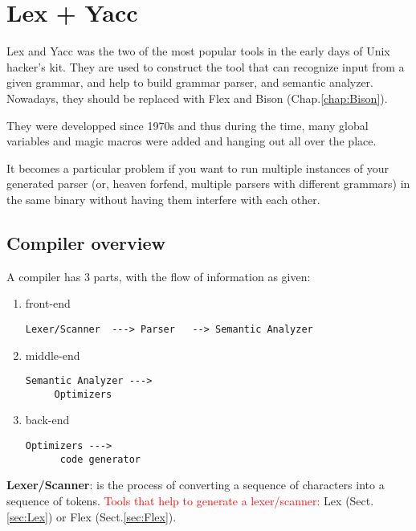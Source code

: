 \chapter{Lex + Yacc}

Lex and Yacc was the two of the most popular tools in the early days of Unix
hacker's kit. They are used to construct the tool that can recognize input from
a given grammar, and help to build grammar parser, and semantic analyzer.
Nowadays, they should be replaced with Flex and Bison (Chap.\ref{chap:Bison}).

They were developped since 1970s and thus during the time, many global
variables and magic macros were added and hanging out all over the place.

It becomes a particular problem if you want to run multiple instances of your
generated parser (or, heaven forfend, multiple parsers with different grammars)
in the same binary without having them interfere with each other.

\section{Compiler overview}
\label{sec:compiler-overview}

A compiler has 3 parts, with the flow of information as given:
\begin{enumerate}
  \item front-end

\begin{verbatim}
Lexer/Scanner  ---> Parser   --> Semantic Analyzer
\end{verbatim}
  
  \item middle-end

\begin{verbatim}
Semantic Analyzer ---> 
     Optimizers
\end{verbatim}  
  
  \item back-end
  
\begin{verbatim}
Optimizers --->
      code generator
\end{verbatim}
\end{enumerate}

{\bf Lexer/Scanner}: is the process of converting a sequence of characters into
a sequence of tokens. \textcolor{red}{Tools that help to generate a
lexer/scanner:} Lex (Sect.\ref{sec:Lex}) or Flex (Sect.\ref{sec:Flex}).

